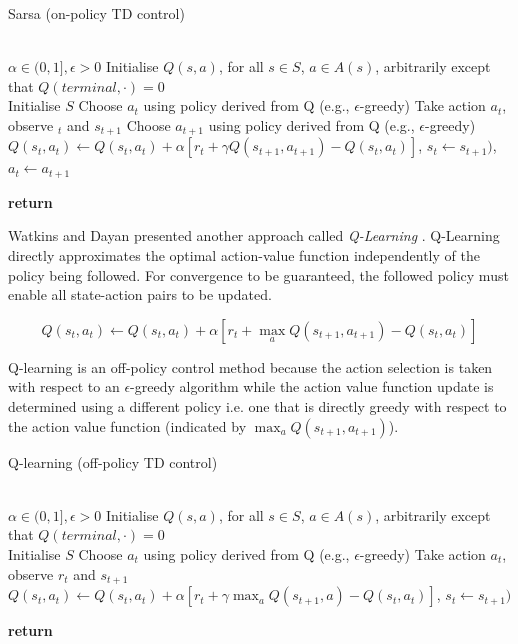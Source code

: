 \begin{algorithm}[H]
\caption{Sarsa (on-policy TD control) \cite{sutton_reinforcement_1998}}
\label{alg:sarsa}
\begin{algorithmic}
\\
\State $\alpha \in (0,1], \epsilon > 0$
\State Initialise $Q(s,a)$, for all $s \in S$, $a \in A(s)$, arbitrarily except that $Q(terminal, \cdot) = 0$
\\
	\State Initialise $S$
 \State Choose $a_t$ using policy derived from Q (e.g., $\epsilon$-greedy)
 \State Take action $a_t$, observe $_t$ and $s_{t+1}$
 \State Choose $a_{t+1}$ using policy derived from Q (e.g., $\epsilon$-greedy)
 \State $Q(s_t,a_t) \gets Q(s_t,a_t) + \alpha[r_t + \gamma Q(s_{t+1}, a_{t+1}) - Q(s_t,a_t)]$,
 \State $s_t \gets s_{t+1})$, $a_{t} \gets a_{t+1}$
 
 \State \textbf{return}
 \EndIf
 \EndFor
\EndFor
\end{algorithmic}
\end{algorithm}

Watkins and Dayan presented another approach called \textit{Q-Learning} \cite{watkins_q-learning_1992}. Q-Learning directly approximates the optimal action-value function independently of the policy being followed. For convergence to be guaranteed, the followed policy must enable all state-action pairs to be updated.

 $$Q(s_t, a_t) \longleftarrow Q(s_t, a_t) + \alpha[r_t + \max_a Q(s_{t+1}, a_{t+1}) - Q(s_t, a_t)]$$

Q-learning is an off-policy control method because the action selection is taken with respect to an $\epsilon$-greedy algorithm while the action value function update is determined using a different policy i.e. one that is directly greedy with respect to the action value function (indicated by $\max_a Q(s_{t+1}, a_{t+1})$). 


\begin{algorithm}[H]
\caption{Q-learning (off-policy TD control) \cite{sutton_reinforcement_1998}}
\label{alg:q-learning}
\begin{algorithmic}
\\
\State $\alpha \in (0,1], \epsilon > 0$
\State Initialise $Q(s,a)$, for all $s \in S$, $a \in A(s)$, arbitrarily except that $Q(terminal, \cdot) = 0$
\\
 \State Initialise $S$
 \State Choose $a_t$ using policy derived from Q (e.g., $\epsilon$-greedy)
 \State Take action $a_t$, observe $r_t$ and $s_{t+1}$
 \State $Q(s_t,a_t) \gets Q(s_t,a_t) + \alpha[r_t + \gamma \max_a Q(s_{t+1}, a) - Q(s_t,a_t)]$,
 \State $s_t \gets s_{t+1})$
 
 \State \textbf{return}
 \EndIf
 \EndFor
\EndFor
\end{algorithmic}
\end{algorithm}

